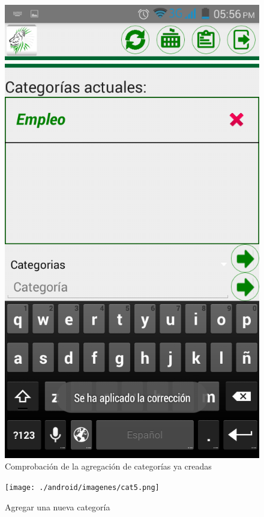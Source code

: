 \begin{figure}
\centering
\includegraphics[scale=0.5]{./android/imagenes/cat4.png}
\caption{Comprobación de la agregación de categorías ya creadas}
\label{cat4}
\end{figure}

\begin{figure}
\centering
\texttt{[image: ./android/imagenes/cat5.png]}
\caption{Agregar una nueva categoría}
\label{cat5}
\end{figure}


